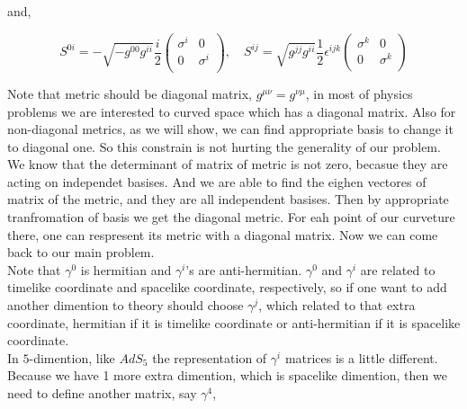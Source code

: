 and,

\begin{equation}
   S^{0i} = -\sqrt{-g^{00}g^{ii}}\frac{i}{2}
   \begin{pmatrix}
      \sigma^i &   0 \\
          0    & \sigma^i \\
   \end{pmatrix}
   , \quad
   S^{ij} = \sqrt{g^{jj}g^{ii}}\frac{1}{2}\epsilon^{ijk}
   \begin{pmatrix}
      \sigma^k &    0 \\
          0    & \sigma^k \\
   \end{pmatrix}
\end{equation}

Note that metric should be diagonal matrix, $g^{\mu\nu} = g^{\nu\mu}$, in most of physics problems we are interested to curved space which has a diagonal matrix. Also for non-diagonal metrics, as we will show, we can find appropriate basis to change it to diagonal one. So this constrain is not hurting the generality of our problem.\\

We know that the determinant of matrix of metric is not zero, becasue they are acting on independet basises. And we are able to find the eighen vectores of matrix of the metric, and they are all independent basises. Then by appropriate tranfromation of basis we get the diagonal metric. For eah point of our curveture there, one can respresent its metric with a diagonal matrix. Now we can come back to our main problem.\\

Note that $\gamma^0$ is hermitian and $\gamma^i$'s are anti-hermitian. $\gamma^0$ and $\gamma^i$ are related to timelike coordinate and spacelike coordinate, respectively, so if one want to add another dimention to theory should choose $\gamma^j$, which related to that extra coordinate, hermitian if it is timelike coordinate or anti-hermitian if it is spacelike coordinate.\\  

In $5$-dimention, like $AdS_5$ the representation of $\gamma^i$ matrices is a little different. Because we have 1 more extra dimention, which is spacelike dimention, then we need to define another matrix, say $\gamma^4$,

